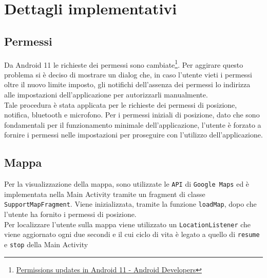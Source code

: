 \documentclass[11pt]{article}
\begin{document}
\section{Dettagli implementativi}
\subsection{Permessi}
\label{sec:permessi}
Da Android 11 le richieste dei permessi sono cambiate\footnote{\href{https://developer.android.com/about/versions/11/privacy/permissions?hl=en\#dialog-visibility}{Permissions updates in Android 11 - Android Developers}}. Per aggirare questo problema si è deciso di mostrare un dialog che, in caso l'utente vieti i permessi oltre il nuovo limite imposto, gli notifichi dell'assenza dei permessi lo indirizza alle impostazioni dell'applicazione per autorizzarli manualmente. \\
Tale procedura è stata applicata per le richieste dei permessi di posizione, notifica, bluetooth e microfono. Per i permessi iniziali di posizione, dato che sono fondamentali per il funzionamento minimale dell'applicazione, l'utente è forzato a fornire i permessi nelle impostazioni per proseguire con l'utilizzo dell'applicazione.
\subsection{Mappa}
Per la visualizzazione della mappa, sono utilizzate le \texttt{API} di \texttt{Google Maps} ed è implementata nella Main Activity tramite un fragment di classe \texttt{SupportMapFragment}. Viene inizializzata, tramite la funzione \texttt{loadMap}, dopo che l'utente ha fornito i permessi di posizione. \\
Per localizzare l'utente sulla mappa viene utilizzato un \texttt{LocationListener} che viene aggiornato ogni due secondi e il cui ciclo di vita è legato a quello di \texttt{resume} e \texttt{stop} della Main Activity
\end{document}

